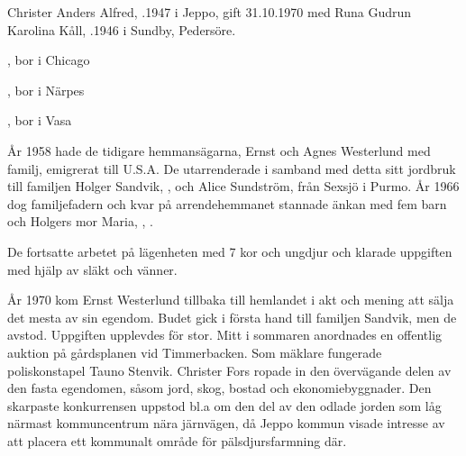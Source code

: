 
Christer Anders Alfred, .1947 i Jeppo, gift 31.10.1970 med Runa Gudrun Karolina Kåll, .1946 i Sundby, Pedersöre.
\begin{jhchildren}
  \item {}
  \item {}, bor i Chicago
  \item {}, bor i Närpes
  \item {}, bor i Vasa
\end{jhchildren}

År 1958 hade de tidigare hemmansägarna, Ernst och Agnes Westerlund med familj, emigrerat till U.S.A. De utarrenderade i samband med detta sitt jordbruk till familjen Holger Sandvik, , och Alice Sundström,  från Sexsjö i Purmo. År 1966 dog familjefadern och kvar på arrendehemmanet stannade änkan med fem barn och Holgers mor Maria, , .
\begin{jhchildren}
  \item {}
  \item {}
  \item {}
  \item {}
  \item {}
\end{jhchildren}
De fortsatte arbetet på lägenheten med 7 kor och ungdjur och klarade uppgiften med hjälp av släkt och vänner.

År 1970 kom Ernst Westerlund tillbaka till hemlandet i akt och  mening att sälja det mesta av sin egendom. Budet gick i första hand till familjen Sandvik, men de avstod. Uppgiften upplevdes för stor. Mitt i sommaren anordnades en offentlig auktion på gårdsplanen vid Timmerbacken. Som mäklare fungerade poliskonstapel Tauno Stenvik. Christer Fors ropade in den övervägande delen av den fasta egendomen, såsom jord, skog, bostad och ekonomiebyggnader. Den skarpaste konkurrensen uppstod bl.a om den del av den odlade jorden som låg närmast kommuncentrum nära järnvägen, då Jeppo kommun visade intresse av att placera ett kommunalt område för  pälsdjursfarmning där.

